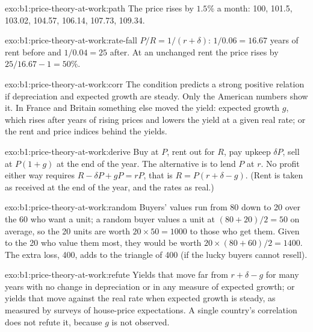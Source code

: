\begin{solution}{exo:b1:price-theory-at-work:path}
The price rises by $1.5\%$ a month: 100, 101.5, 103.02, 104.57, 106.14, 107.73,
109.34.
\end{solution}

\begin{solution}{exo:b1:price-theory-at-work:rate-fall}
$P/R = 1/(r + \delta)$: $1/0.06 = 16.67$ years of rent before and $1/0.04 = 25$ after. At an
unchanged rent the price rises by $25/16.67 - 1 = 50\%$.
\end{solution}

\begin{solution}{exo:b1:price-theory-at-work:corr}
The condition predicts a strong positive relation if depreciation and
expected growth are steady. Only the American numbers show it. In France
and Britain something else moved the yield: expected growth $g$, which
rises after years of rising prices and lowers the yield at a given real
rate; or the rent and price indices behind the yields.
\end{solution}

\begin{solution}{exo:b1:price-theory-at-work:derive}
Buy at $P$, rent out for $R$, pay upkeep $\delta P$, sell at $P(1 + g)$ at the end of the
year. The alternative is to lend $P$ at $r$. No profit either way requires
$R - \delta P + gP = rP$, that is $R = P(r + \delta - g)$. (Rent is taken as received at the
end of the year, and the rates as real.)
\end{solution}

\begin{solution}{exo:b1:price-theory-at-work:random}
Buyers' values run from 80 down to 20 over the 60 who want a unit; a random
buyer values a unit at $(80 + 20)/2 = 50$ on average, so the 20 units are worth
$20 \times 50 = 1000$ to those who get them. Given to the 20 who value them most,
they would be worth $20 \times (80 + 60)/2 = 1400$. The extra loss, 400, adds to the
triangle of 400 (if the lucky buyers cannot resell).
\end{solution}

\begin{solution}{exo:b1:price-theory-at-work:refute}
Yields that move far from $r + \delta - g$ for many years with no change in
depreciation or in any measure of expected growth; or yields that move
against the real rate when expected growth is steady, as measured by
surveys of house-price expectations. A single country's correlation does
not refute it, because $g$ is not observed.
\end{solution}


